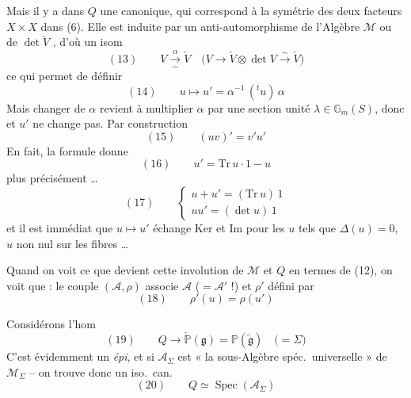 \documentclass[11pt,a4paper]{article}
\begin{document}
Mais il y a dans $Q$ une  
canonique, qui correspond à la symétrie des deux facteurs $X \times X$ dans (6).
Elle est induite par un anti-automorphisme  de l'Algèbre $\mathcal{M}$
 
 ou de $\det \check{V}$ , d'où un isom
\struck{\ill{}}
\[
  (13) \qquad V \xrightarrow[\sim]{\ \alpha\ } \check{V} \quad \bigl(V \to \check{V} \otimes \det V \xrightarrow{\sim} \check{V}\bigr)
\]
ce qui permet de définir
\[
  (14) \qquad u \longmapsto u' = \alpha^{-1}\, ({}^{t}u)\, \alpha
\]
Mais changer de $\alpha$ revient à multiplier $\alpha$ par une section unité
$\lambda \in \mathbb{G}_m(S)$, donc 
\struck{\ill{}} et $u'$ ne change pas. Par construction
\[
  (15) \qquad (uv)' = v' u'
\]
En fait, la formule donne
\[
  (16) \qquad u' = \mathrm{Tr}\, u \cdot 1 - u
\]
plus précisément \ldots
\[
  (17) \qquad
  \begin{cases}
    u + u' = (\mathrm{Tr}\, u)\, 1 \\
    u u' = (\det u)\, 1
  \end{cases}
\]
et il est immédiat que $u \mapsto u'$ échange Ker et Im pour les $u$ tels que
$\Delta(u) = 0$, $u$ non nul sur les fibres \ldots
{}

Quand on voit ce que devient cette involution de $\mathcal{M}$ et $Q$ en termes de
(12), on voit que : le couple $(\mathcal{A}, \rho)$  associe
$\mathcal{A}$ ($= \mathcal{A}'$ !) et $\rho'$ défini par
\[
  (18) \qquad \rho'(u) = \rho(u')
\]

Considérons l'hom
\[
  (19) \qquad Q \longrightarrow \check{\mathbb{P}}(\mathfrak{g}) = \mathbb{P}(\widetilde{\mathfrak{g}}) \quad \bigl(= \Sigma\bigr)
\]
C'est évidemment un \emph{épi}, et si $\mathcal{A}_{\Sigma}$ est « la
sous-Algèbre spéc.\ universelle » de $\mathcal{M}_{\Sigma}$ -- on trouve donc un iso.\ can.
\[
  (20) \qquad Q \simeq \operatorname{Spec}(\mathcal{A}_{\Sigma})
\]
\end{document}
